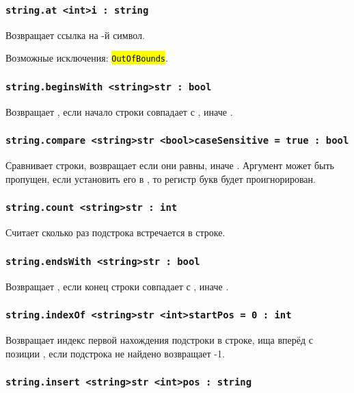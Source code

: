 \documentclass[a4paper, 14pt]{extarticle}
\newcommand{\ferror}[1]{\foreignlanguage{english}{\fontsize{11pt}{12pt}\tt{\sethlcolor{yellow}\hl{#1}}}}
\begin{document}
\subsubsection{\lstinline|string.at <int>i : string|}

Возвращает ссылка на -й символ.

Возможные исключения: \ferror{OutOfBounds}.

\subsubsection{\lstinline|string.beginsWith <string>str : bool|}

Возвращает \true{}, если начало строки совпадает с , иначе \false{}.

\subsubsection{\lstinline|string.compare <string>str <bool>caseSensitive = true : bool|}

Сравнивает строки, возвращает \true{} если они равны, иначе \false{}. Аргумент  может быть пропущен, если установить его в \false{}, то регистр букв будет проигнорирован.

\subsubsection{\lstinline|string.count <string>str : int|}

Считает сколько раз подстрока  встречается в строке.

\subsubsection{\lstinline|string.endsWith <string>str : bool|}

Возвращает \true{}, если конец строки совпадает с , иначе \false{}.

\subsubsection{\lstinline|string.indexOf <string>str <int>startPos = 0 : int|}

Возвращает индекс первой нахождения подстроки  в строке, ища вперёд с позиции , если подстрока не найдено возвращает -1.

\subsubsection{\lstinline|string.insert <string>str <int>pos : string|}
\end{document}
